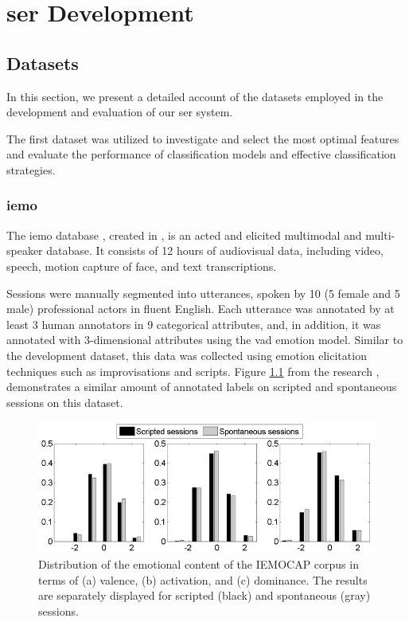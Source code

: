 \chapter{\ac{ser} Development}
\label{chapter:strat}

\section{Datasets}

In this section, we present a detailed account of the datasets employed in the development and evaluation of our \ac{ser} system.

The first dataset was utilized to investigate and select the most optimal features and evaluate the performance of classification models and effective classification strategies.

\subsection{\ac{iemo}}

The \ac{iemo} database \cite{Busso2008}, created in \citeyear{Busso2008}, is an acted and elicited multimodal and multi-speaker database. It consists of 12 hours of audiovisual data, including video, speech, motion capture of face, and text transcriptions.

Sessions were manually segmented into utterances, spoken by 10 (5 female and 5 male) professional actors in fluent English. Each utterance was annotated by at least 3 human annotators in 9 categorical attributes, and, in addition, it was annotated with 3-dimensional attributes using the \ac{vad} emotion model. Similar to the development dataset, this data was collected using emotion elicitation techniques such as improvisations and scripts. Figure \ref{fig:bar_plots_distribution} from the research  \cite{Busso2008}, demonstrates a similar amount of annotated labels on scripted and spontaneous sessions on this dataset.

\begin{figure}[H]
	\centering
	\includegraphics[width=.8\linewidth]{figs/4_1_traditional/scripted_spont_distribution.png}
	\caption{Distribution of the emotional content of the IEMOCAP corpus in terms of (a) valence, (b) activation, and (c) dominance. The results are separately displayed for scripted (black) and spontaneous (gray) sessions.}
	\label{fig:bar_plots_distribution}
\end{figure}


